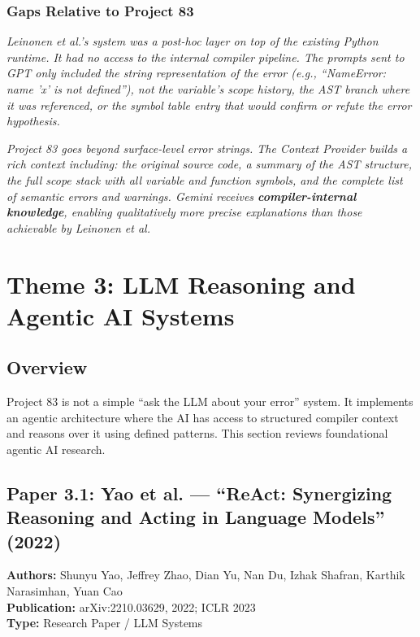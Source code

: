 \documentclass[a4paper,11pt]{article}
\newcommand{\papergap}[1]{%
  \begin{tcolorbox}[colback=red!5!white, colframe=red!60!black, title={Research Gap Identified}]
  \textit{#1}
  \end{tcolorbox}
}
\newcommand{\oursolution}[1]{%
  \begin{tcolorbox}[colback=green!5!white, colframe=green!60!black, title={How Project 83 Solves This Gap}]
  \textit{#1}
  \end{tcolorbox}
}
\begin{document}
\subsubsection{Gaps Relative to Project 83}

\papergap{Leinonen et al.'s system was a post-hoc layer on top of the existing Python runtime. It had no access to the internal compiler pipeline. The prompts sent to GPT only included the \textit{string representation} of the error (e.g., ``NameError: name 'x' is not defined''), not the variable's scope history, the AST branch where it was referenced, or the symbol table entry that would confirm or refute the error hypothesis.}

\oursolution{Project 83 goes beyond surface-level error strings. The Context Provider builds a rich context including: the original source code, a summary of the AST structure, the full scope stack with all variable and function symbols, and the complete list of semantic errors and warnings. Gemini receives \textbf{compiler-internal knowledge}, enabling qualitatively more precise explanations than those achievable by Leinonen et al.}

\newpage

\section{Theme 3: LLM Reasoning and Agentic AI Systems}

\subsection{Overview}

Project 83 is not a simple ``ask the LLM about your error'' system. It implements an agentic architecture where the AI has access to structured compiler context and reasons over it using defined patterns. This section reviews foundational agentic AI research.

\subsection{Paper 3.1: Yao et al. --- ``ReAct: Synergizing Reasoning and Acting in Language Models'' (2022)}

\begin{tcolorbox}[colback=gray!5, colframe=gray!40]
\textbf{Authors:} Shunyu Yao, Jeffrey Zhao, Dian Yu, Nan Du, Izhak Shafran, Karthik Narasimhan, Yuan Cao \\
\textbf{Publication:} arXiv:2210.03629, 2022; ICLR 2023 \\
\textbf{Type:} Research Paper / LLM Systems
\end{tcolorbox}
\end{document}
